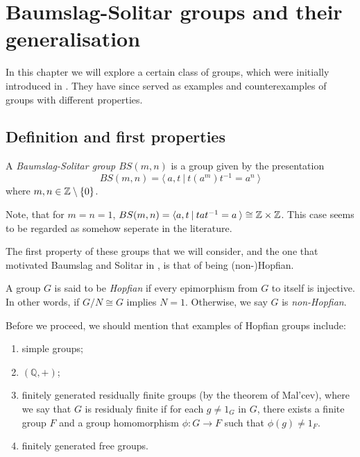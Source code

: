 \pagebreak %

\section{Baumslag-Solitar groups and their generalisation}

In this chapter we will explore a certain class of groups, which were initially introduced in \cite{BaSo62}. They have since served as examples and counterexamples of groups with different properties.

\subsection{Definition and first properties}

\begin{definition}
    A \emph{Baumslag-Solitar group $BS(m,n)$} is a group given by the presentation \[BS(m,n) = \langle \: a, t\:|\:t(a^m)t^{-1} = a^n \: \rangle \] where $m,n \in \mathbb{Z} \setminus \{0\}$.
\end{definition}

\begin{remark}
    Note, that for $m = n = 1$, $BS(m,n) = \langle a,t \: | \: tat^{-1} = a \: \rangle \cong \mathbb{Z} \times \mathbb{Z}$. This case seems to be regarded as somehow seperate in the literature.
\end{remark}

The first property of these groups that we will consider, and the one that motivated Baumslag and Solitar in \cite{BaSo62}, is that of being (non-)Hopfian.

\begin{definition}
    A group $G$ is said to be \emph{Hopfian} if every epimorphism from $G$ to itself is injective. In other words, if $G/N \cong G$ implies $N = 1$. Otherwise, we say $G$ is \emph{non-Hopfian}.
\end{definition}
    
Before we proceed, we should mention that examples of Hopfian groups include:
\begin{enumerate}
    \item simple groups;
    \item $(\mathbb{Q},+)$;
    \item finitely generated residually finite groups (by the theorem of Mal'cev), where we say that $G$ is residualy finite if for each $g \neq 1_G$ in $G$, there exists a finite group $F$ and a group homomorphism $\phi: G \to F$ such that $\phi(g) \neq 1_F$.
    \item finitely generated free groups.
\end{enumerate}

